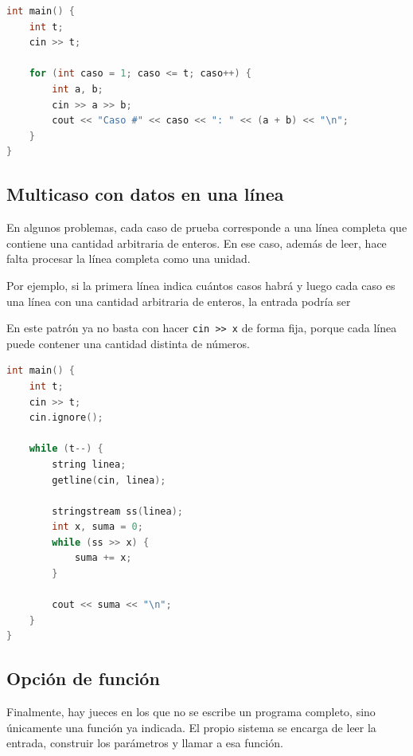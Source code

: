 \begin{lstlisting}[language=C++]
int main() {
    int t;
    cin >> t;

    for (int caso = 1; caso <= t; caso++) {
        int a, b;
        cin >> a >> b;
        cout << "Caso #" << caso << ": " << (a + b) << "\n";
    }
}
\end{lstlisting}

\subsection{Multicaso con datos en una línea}

En algunos problemas, cada caso de prueba corresponde a una línea completa que contiene una cantidad arbitraria de enteros. En ese caso, además de leer, hace falta procesar la línea completa como una unidad.

Por ejemplo, si la primera línea indica cuántos casos habrá y luego cada caso es una línea con una cantidad arbitraria de enteros, la entrada podría ser


En este patrón ya no basta con hacer \verb|cin >> x| de forma fija, porque cada línea puede contener una cantidad distinta de números.

\begin{lstlisting}[language=C++]
int main() {
    int t;
    cin >> t;
    cin.ignore();

    while (t--) {
        string linea;
        getline(cin, linea);

        stringstream ss(linea);
        int x, suma = 0;
        while (ss >> x) {
            suma += x;
        }

        cout << suma << "\n";
    }
}
\end{lstlisting}

\subsection{Opción de función}

Finalmente, hay jueces en los que no se escribe un programa completo, sino únicamente una función ya indicada. El propio sistema se encarga de leer la entrada, construir los parámetros y llamar a esa función.

